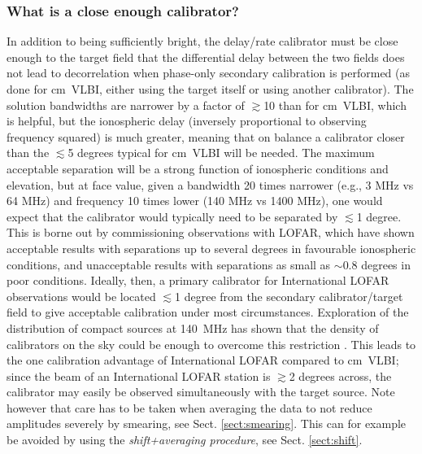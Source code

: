 \documentclass[graybox]{svmult}
\begin{document}
\subsubsection{What is a close enough calibrator?}
In addition to being sufficiently bright, the delay/rate calibrator must be
close enough to the target field that the differential delay between the two
fields does not lead to decorrelation when phase-only secondary calibration is
performed (as done for cm~VLBI, either using the target itself or using another
calibrator).  The solution bandwidths are narrower by a factor of $\gtrsim$10
than for cm~VLBI, which is helpful, but the ionospheric delay (inversely
proportional to observing frequency squared) is much greater, meaning that on
balance a calibrator closer than the $\lesssim$5 degrees typical for cm~VLBI
will be needed.  The maximum acceptable separation will be a strong function of
ionospheric conditions and elevation, but at face value, given a bandwidth 20
times narrower (e.g., 3 MHz vs 64 MHz) and frequency 10 times lower (140 MHz vs
1400 MHz), one would expect that the calibrator would typically need to be
separated by $\lesssim$1 degree.  This is borne out by commissioning
observations with LOFAR, which have shown acceptable results with separations
up to several degrees in favourable ionospheric conditions, and unacceptable
results with separations as small as $\sim$0.8 degrees in poor conditions.
Ideally, then, a primary calibrator for International LOFAR observations would
be located $\lesssim$1 degree from the secondary calibrator/target field to
give acceptable calibration under most circumstances. Exploration of the
distribution of compact sources at 140~MHz has shown that the density of
calibrators on the sky could be enough to overcome this restriction
\citep{moldon15}. This leads to the one calibration advantage of International
LOFAR compared to cm~VLBI; since the beam of an International LOFAR station is
$\gtrsim$2 degrees across, the calibrator may easily be observed simultaneously
with the target source. Note however that care has to be taken when averaging
the data to not reduce amplitudes severely by smearing, see Sect.
\ref{sect:smearing}.  This can for example be avoided by using the
\emph{shift+averaging procedure}, see Sect. \ref{sect:shift}.
\end{document}

